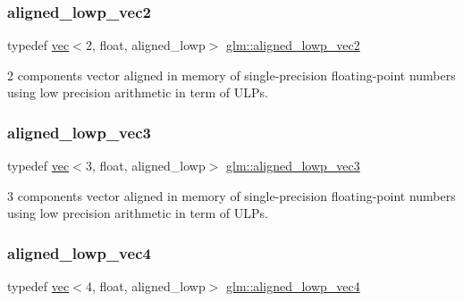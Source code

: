 \subsubsection{\texorpdfstring{aligned\+\_\+lowp\+\_\+vec2}{aligned\_lowp\_vec2}}
{\footnotesize\ttfamily typedef \mbox{\hyperlink{structglm_1_1vec}{vec}}$<$2, float, aligned\+\_\+lowp$>$ \mbox{\hyperlink{group__gtc__type__aligned_ga10048e69ffac79ec5ea059398485114e}{glm\+::aligned\+\_\+lowp\+\_\+vec2}}}



2 components vector aligned in memory of single-\/precision floating-\/point numbers using low precision arithmetic in term of U\+L\+Ps. 

\mbox{\label{group__gtc__type__aligned_ga74eb3cf8a9ff6234da5d26f9203e179d}} 
\subsubsection{\texorpdfstring{aligned\+\_\+lowp\+\_\+vec3}{aligned\_lowp\_vec3}}
{\footnotesize\ttfamily typedef \mbox{\hyperlink{structglm_1_1vec}{vec}}$<$3, float, aligned\+\_\+lowp$>$ \mbox{\hyperlink{group__gtc__type__aligned_ga74eb3cf8a9ff6234da5d26f9203e179d}{glm\+::aligned\+\_\+lowp\+\_\+vec3}}}



3 components vector aligned in memory of single-\/precision floating-\/point numbers using low precision arithmetic in term of U\+L\+Ps. 

\mbox{\label{group__gtc__type__aligned_gaba45497051d04e2aa681653c14fc023c}} 
\subsubsection{\texorpdfstring{aligned\+\_\+lowp\+\_\+vec4}{aligned\_lowp\_vec4}}
{\footnotesize\ttfamily typedef \mbox{\hyperlink{structglm_1_1vec}{vec}}$<$4, float, aligned\+\_\+lowp$>$ \mbox{\hyperlink{group__gtc__type__aligned_gaba45497051d04e2aa681653c14fc023c}{glm\+::aligned\+\_\+lowp\+\_\+vec4}}}



